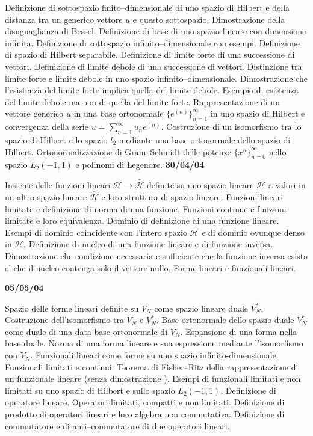 \documentclass[a4paper,10pt]{article}
\begin{document}
\noindent
Definizione di sottospazio finito--dimensionale di uno spazio di Hilbert e della distanza tra un generico vettore $u$ e questo sottospazio. Dimostrazione della disuguaglianza di Bessel. Definizione di base di uno spazio lineare con dimensione infinita. Definizione di sottospazio infinito--dimensionale con esempi. Definizione di spazio di Hilbert separabile. Definizione di limite forte di una successione di vettori. Definizione di limite debole di una successione di vettori. Distinzione tra limite forte e limite debole in uno spazio infinito--dimensionale. Dimostrazione che l'esistenza del limite forte implica quella del limite debole. Esempio di esistenza del limite debole ma non di quella del limite forte. Rappresentazione di un vettore generico $u$ in una base ortonormale $\{e^{(n)}\}_{n=1}^{\infty}$ in uno spazio di Hilbert e convergenza della serie $u=\sum_{n=1}^{\infty} u_n e^{(n)}$. Costruzione di un isomorfismo tra lo spazio di Hilbert e lo spazio $l_2$ mediante una base ortonormale dello spazio di Hilbert. Ortonormalizzazione di Gram--Schmidt delle potenze $\{x^n\}_{n=0}^{\infty}$ nello spazio $L_2(-1,1)$ e polinomi di Legendre.
\vskip 12pt
\noindent
\textbf{30/04/04}

\noindent 
Insieme delle funzioni lineari $\mathcal{H}\rightarrow \mathcal{\hat{H}}$ definite su uno spazio lineare
$\mathcal{H}$ a valori in un altro spazio lineare $\mathcal{\hat{H}}$ e loro struttura di spazio lineare. Funzioni lineari limitate e definizione di norma di una funzione. Funzioni continue e funzioni limitate e loro equivalenza. Dominio di definizione di una funzione lineare. Esempi di dominio coincidente con l'intero spazio $\mathcal{H}$ e di dominio ovunque denso in $\mathcal{H}$. Definizione di nucleo di una funzione lineare e di funzione inversa. Dimostrazione che condizione necessaria e sufficiente che la funzione inversa esista e' che il nucleo contenga solo il vettore nullo. Forme lineari e funzionali lineari.
\vskip 12pt
\newpage

\noindent
\textbf{05/05/04}

\noindent 
Spazio delle forme lineari definite su $V_N$ come spazio lineare duale $V^{\ast}_N$. Costruzione dell'isomorfismo tra $V_N$ e $V^{\ast}_N$. Base ortonormale dello spazio duale $V^{\ast}_N$ come duale di una data base ortonormale di $V_N$. Espansione di una forma nella base duale. Norma di una forma lineare e sua espressione mediante l'isomorfismo con $V_N$. Funzionali lineari come forme su uno spazio infinito-dimensionale. Funzionali limitati e continui. Teorema di Fisher--Ritz della rappresentazione di un funzionale lineare (senza dimostrazione ). Esempi di funzionali limitati e non limitati su uno spazio di Hilbert e sullo spazio $L_2(-1,1)$. Definizione di operatore lineare. Operatori limitati, compatti e non limitati. Definizione di prodotto di operatori lineari e loro algebra non commutativa. Definizione di commutatore e di anti--commutatore di due operatori lineari. 
\end{document}
